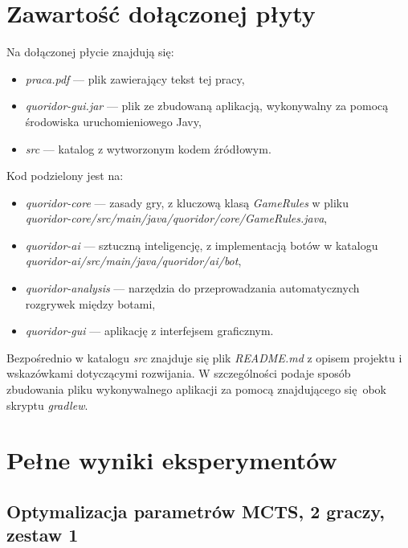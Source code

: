 \documentclass{pracamgr}
\begin{document}
\begin{appendices}

    \chapter{Zawartość dołączonej płyty \label{code}}

    Na dołączonej płycie znajdują się:
\begin{itemize}
    \item \textit{praca.pdf} --- plik zawierający tekst tej pracy,
    \item \textit{quoridor-gui.jar} --- plik ze zbudowaną aplikacją, wykonywalny za pomocą środowiska uruchomieniowego Javy,
    \item \textit{src} --- katalog z wytworzonym kodem źródłowym.
\end{itemize}

Kod podzielony jest na:

\begin{itemize}
    \item \textit{quoridor-core} --- zasady gry, z kluczową klasą \textit{GameRules} w pliku \\ \textit{quoridor-core/src/main/java/quoridor/core/GameRules.java},
    \item \textit{quoridor-ai} --- sztuczną inteligencję, z implementacją botów w katalogu \\ \textit{quoridor-ai/src/main/java/quoridor/ai/bot},
    \item \textit{quoridor-analysis} --- narzędzia do przeprowadzania automatycznych rozgrywek między botami,
    \item \textit{quoridor-gui} --- aplikację z interfejsem graficznym.
\end{itemize}

    Bezpośrednio w katalogu \textit{src} znajduje się plik \textit{README.md} z opisem projektu i wskazówkami dotyczącymi rozwijania.
    W szczególności podaje sposób zbudowania pliku wykonywalnego aplikacji za pomocą znajdującego się obok skryptu \textit{gradlew}.

\chapter{Pełne wyniki eksperymentów}

\section{Optymalizacja parametrów MCTS, 2 graczy, zestaw 1\label{results-1-2p}}


\end{appendices}
\end{document}
